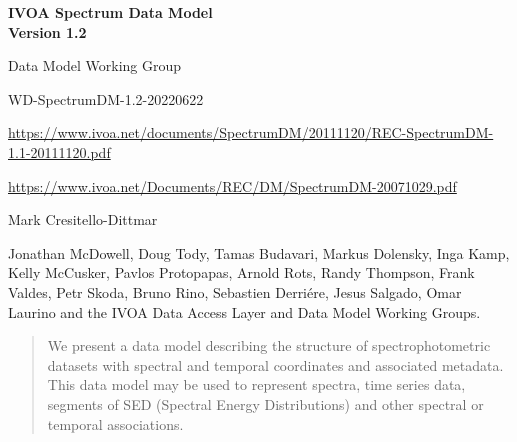 \documentclass[11pt]{article}
\newcommand{\htmtitle}[2]{\parbox{6.0in}{ \bf \huge #1 \\  \Large  #2}}
\newcommand{\heol}{} %
\newcommand{\link}[1]{{\color{dblue}\htmladdnormallink{#1}{}\par}}
\begin{document}
\vskip -1in
\heol
{}

\color{dblue}
\vskip 0.2in
\par\noindent \htmtitle{IVOA Spectrum Data Model}{Version 1.2}
\Large
\vskip 0.1in
\par{}
\color{Black}
\vskip 0.2in

\normalsize

\par{}

Data Model Working Group

\par{}

{ 
\color{dblue}
WD-SpectrumDM-1.2-20220622
}

\par{}

{\color{dblue}
  \url{https://www.ivoa.net/documents/SpectrumDM/20111120/REC-SpectrumDM-1.1-20111120.pdf}
  
  \url{https://www.ivoa.net/Documents/REC/DM/SpectrumDM-20071029.pdf}
}

\vskip 0.2in


Mark Cresitello-Dittmar


Jonathan McDowell, Doug Tody, 
Tamas Budavari,  Markus Dolensky, Inga Kamp, 
Kelly McCusker, Pavlos Protopapas, Arnold Rots, Randy Thompson, Frank Valdes, Petr Skoda, Bruno Rino,
Sebastien Derri\'{e}re, Jesus Salgado, Omar Laurino
and the IVOA Data Access Layer and Data Model Working Groups.


\begin{abstract}

We present a data model describing the structure of spectrophotometric
datasets with spectral and temporal coordinates and associated metadata.
This data model may be used to represent 
spectra, time series data,
segments of SED (Spectral Energy Distributions) and other
spectral or temporal associations.

\end{abstract}
\end{document}
